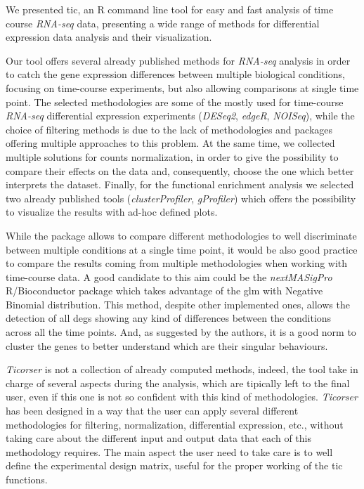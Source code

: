 We presented \gls{tic}, an R command line tool for easy and fast analysis of time course \textit{RNA-seq} data, presenting a wide range of methods for differential expression data analysis and their visualization.

Our tool offers several already published methods for \textit{RNA-seq} analysis in order to catch the gene expression differences between multiple biological conditions, focusing on time-course experiments, but also allowing comparisons at single time point.
The selected methodologies are some of the mostly used for time-course \textit{RNA-seq} differential expression experiments (\textit{DESeq2}, \textit{edgeR}, \textit{NOISeq}), while the choice of filtering methods is due to the lack of methodologies and packages offering multiple approaches to this problem.
At the same time, we collected multiple solutions for counts normalization, in order to give the possibility to compare their effects on the data and, consequently, choose the one which better interprets the dataset.
Finally, for the functional enrichment analysis we selected two already published tools (\textit{clusterProfiler}, \textit{gProfiler}) which offers the possibility to visualize the results with ad-hoc defined plots.

While the package allows to compare different methodologies to well discriminate between multiple conditions at a single time point, it would be also good practice to compare the results coming from multiple methodologies when working with time-course data.
A good candidate to this aim could be the \textit{nextMASigPro} R/Bioconductor package which takes advantage of the \gls{glm} with Negative Binomial distribution.
This method, despite other implemented ones, allows the detection of all \glspl{deg} showing any kind of differences between the conditions across all the time points.
And, as suggested by the authors, it is a good norm to cluster the genes to better understand which are their singular behaviours.

\textit{Ticorser} is not a collection of already computed methods, indeed, the tool take in charge of several aspects during the analysis, which are tipically left to the final user, even if this one is not so confident with this kind of methodologies.
\textit{Ticorser} has been designed in a way that the user can apply several different methodologies for filtering, normalization, differential expression, etc., without taking care about the different input and output data that each of this methodology requires.
The main aspect the user need to take care is to well define the experimental design matrix, useful for the proper working of the \gls{tic} functions.

